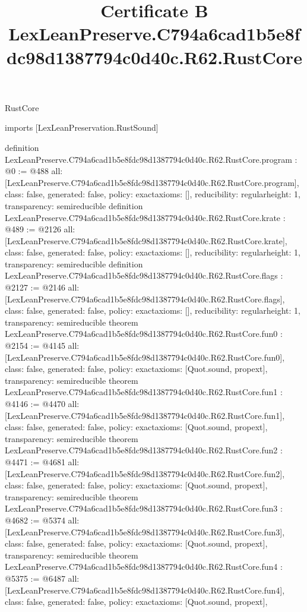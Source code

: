 \begin{lexlean}{RustCore}
\title{Certificate B LexLeanPreserve.C794a6cad1b5e8fdc98d1387794c0d40c.R62.RustCore}
\begin{coremodule}
imports [LexLeanPreservation.RustSound]

definition LexLeanPreserve.C794a6cad1b5e8fdc98d1387794c0d40c.R62.RustCore.program : @0 := @488 {
  all: [LexLeanPreserve.C794a6cad1b5e8fdc98d1387794c0d40c.R62.RustCore.program],
  class: false,
  generated: false,
  policy: exact{axioms: []},
  reducibility: regular{height: 1},
  transparency: semireducible
}
definition LexLeanPreserve.C794a6cad1b5e8fdc98d1387794c0d40c.R62.RustCore.krate : @489 := @2126 {
  all: [LexLeanPreserve.C794a6cad1b5e8fdc98d1387794c0d40c.R62.RustCore.krate],
  class: false,
  generated: false,
  policy: exact{axioms: []},
  reducibility: regular{height: 1},
  transparency: semireducible
}
definition LexLeanPreserve.C794a6cad1b5e8fdc98d1387794c0d40c.R62.RustCore.flags : @2127 := @2146 {
  all: [LexLeanPreserve.C794a6cad1b5e8fdc98d1387794c0d40c.R62.RustCore.flags],
  class: false,
  generated: false,
  policy: exact{axioms: []},
  reducibility: regular{height: 1},
  transparency: semireducible
}
theorem LexLeanPreserve.C794a6cad1b5e8fdc98d1387794c0d40c.R62.RustCore.fun0 : @2154 := @4145 {
  all: [LexLeanPreserve.C794a6cad1b5e8fdc98d1387794c0d40c.R62.RustCore.fun0],
  class: false,
  generated: false,
  policy: exact{axioms: [Quot.sound, propext]},
  transparency: semireducible
}
theorem LexLeanPreserve.C794a6cad1b5e8fdc98d1387794c0d40c.R62.RustCore.fun1 : @4146 := @4470 {
  all: [LexLeanPreserve.C794a6cad1b5e8fdc98d1387794c0d40c.R62.RustCore.fun1],
  class: false,
  generated: false,
  policy: exact{axioms: [Quot.sound, propext]},
  transparency: semireducible
}
theorem LexLeanPreserve.C794a6cad1b5e8fdc98d1387794c0d40c.R62.RustCore.fun2 : @4471 := @4681 {
  all: [LexLeanPreserve.C794a6cad1b5e8fdc98d1387794c0d40c.R62.RustCore.fun2],
  class: false,
  generated: false,
  policy: exact{axioms: [Quot.sound, propext]},
  transparency: semireducible
}
theorem LexLeanPreserve.C794a6cad1b5e8fdc98d1387794c0d40c.R62.RustCore.fun3 : @4682 := @5374 {
  all: [LexLeanPreserve.C794a6cad1b5e8fdc98d1387794c0d40c.R62.RustCore.fun3],
  class: false,
  generated: false,
  policy: exact{axioms: [Quot.sound, propext]},
  transparency: semireducible
}
theorem LexLeanPreserve.C794a6cad1b5e8fdc98d1387794c0d40c.R62.RustCore.fun4 : @5375 := @6487 {
  all: [LexLeanPreserve.C794a6cad1b5e8fdc98d1387794c0d40c.R62.RustCore.fun4],
  class: false,
  generated: false,
  policy: exact{axioms: [Quot.sound, propext]},
}
\end{coremodule}
\end{lexlean}
